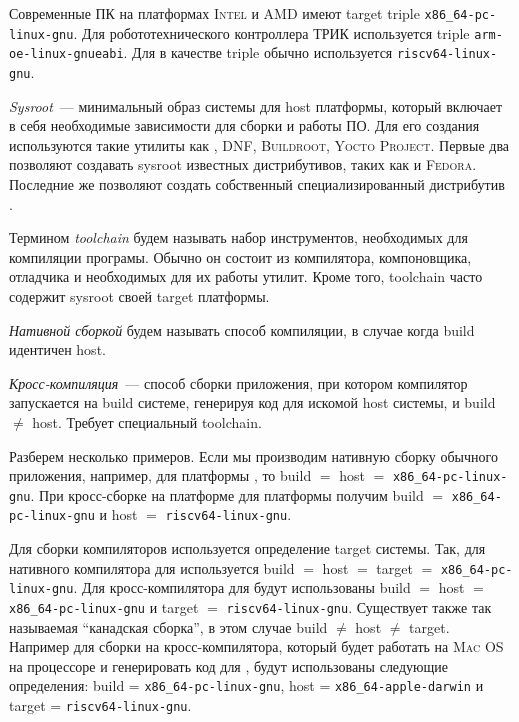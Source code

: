 Современные ПК на платформах \textsc{Intel} и \textsc{AMD} имеют target triple \texttt{x86\_64-pc-linux-gnu}.
Для робототехнического контроллера ТРИК используется triple \texttt{arm-oe-linux-gnueabi}.
Для \riscv{} в качестве triple обычно используется \texttt{riscv64-linux-gnu}.

\begin{definition}[Sysroot]
	\textit{Sysroot}~--- минимальный образ системы для host платформы, который включает в себя необходимые зависимости для сборки и работы ПО.
	Для его создания используются такие утилиты как \debootstrap{}, \textsc{DNF}, \textsc{Buildroot}, \textsc{Yocto Project}.
	Первые два позволяют создавать sysroot известных дистрибутивов, таких как \debian{} и \textsc{Fedora}.
	Последние же позволяют создать собственный специализированный дистрибутив \linux{}.
\end{definition}

\begin{definition}[Toolchain]
	Термином \textit{toolchain} будем называть набор инструментов, необходимых для компиляции програмы.
	Обычно он состоит из компилятора, компоновщика, отладчика и необходимых для их работы утилит.
	Кроме того, toolchain часто содержит sysroot своей target платформы.
\end{definition}

\begin{definition}
	\textit{Нативной сборкой} будем называть способ компиляции, в случае когда build идентичен host.
\end{definition}

\begin{definition}
	\textit{Кросс-компиляция}~--- способ сборки приложения, при котором компилятор запускается на build системе, генерируя код для искомой host системы, и build $\neq$ host.
	Требует специальный toolchain.
\end{definition}

Разберем несколько примеров.
Если мы производим нативную сборку обычного приложения, например, для платформы \amd{}, то build $=$ host $=$ \texttt{x86\_64-pc-linux-gnu}.
При кросс-сборке на платформе \amd{} для платформы \riscv{} получим build $=$ \texttt{x86\_64-pc-linux-gnu} и host $=$ \texttt{riscv64-linux-gnu}.

Для сборки компиляторов используется определение target системы.
Так, для нативного компилятора для \amd{} используется build $=$ host $=$ target $=$ \texttt{x86\_64-pc-linux-gnu}.
Для кросс-компилятора для \riscv{} будут использованы build $=$ host $=$ \texttt{x86\_64-pc-linux-gnu} и target $=$ \texttt{riscv64-linux-gnu}.
Существует также так называемая \enquote{канадская сборка}, в этом случае build $\neq$ host $\neq$ target.
Например для сборки на \amd{} кросс-компилятора, который будет работать на \textsc{Mac OS} на процессоре \amd{} и генерировать код для \riscv{}, будут использованы следующие определения: build = \texttt{x86\_64-pc-linux-gnu}, host = \texttt{x86\_64-apple-darwin} и target = \texttt{riscv64-linux-gnu}.

